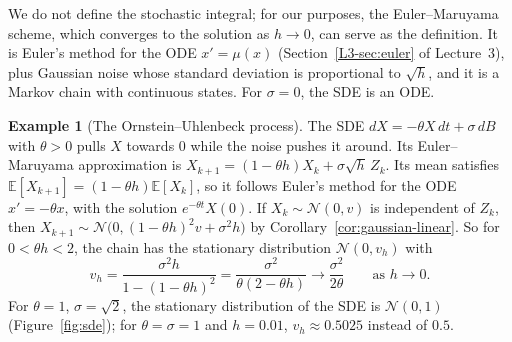 \documentclass[11pt]{article}
\newcommand{\E}{\mathbb{E}}
\theoremstyle{definition}
\newtheorem{example}[definition]{Example}
\theoremstyle{plain}
\theoremstyle{remark}
\begin{document}
We do not define the stochastic integral; for our purposes, the Euler--Maruyama scheme, which converges to the solution as $h \to 0$, can serve as the definition. It is Euler's method for the ODE $x' = \mu(x)$ (Section~\ref{L3-sec:euler} of Lecture~3), plus Gaussian noise whose standard deviation is proportional to $\sqrt{h}$, and it is a Markov chain with continuous states. For $\sigma = 0$, the SDE is an ODE.

\begin{example}[The Ornstein--Uhlenbeck process]\label{ex:ou}
    The SDE $dX = -\theta X\,dt + \sigma\,dB$ with $\theta > 0$ pulls $X$ towards $0$ while the noise pushes it around. Its Euler--Maruyama approximation is $X_{k+1} = (1 - \theta h)X_k + \sigma\sqrt{h}\,Z_k$. Its mean satisfies $\E[X_{k+1}] = (1 - \theta h)\E[X_k]$, so it follows Euler's method for the ODE $x' = -\theta x$, with the solution $e^{-\theta t}X(0)$. If $X_k \sim \mathcal{N}(0, v)$ is independent of $Z_k$, then $X_{k+1} \sim \mathcal{N}\big(0, (1 - \theta h)^2v + \sigma^2h\big)$ by Corollary~\ref{cor:gaussian-linear}. So for $0 < \theta h < 2$, the chain has the stationary distribution $\mathcal{N}(0, v_h)$ with
    \[v_h = \frac{\sigma^2h}{1 - (1 - \theta h)^2} = \frac{\sigma^2}{\theta(2 - \theta h)} \to \frac{\sigma^2}{2\theta} \qquad \text{as } h \to 0.\]
    For $\theta = 1$, $\sigma = \sqrt{2}$, the stationary distribution of the SDE is $\mathcal{N}(0, 1)$ (Figure~\ref{fig:sde}); for $\theta = \sigma = 1$ and $h = 0.01$, $v_h \approx 0.5025$ instead of $0.5$.
\end{example}
\end{document}
